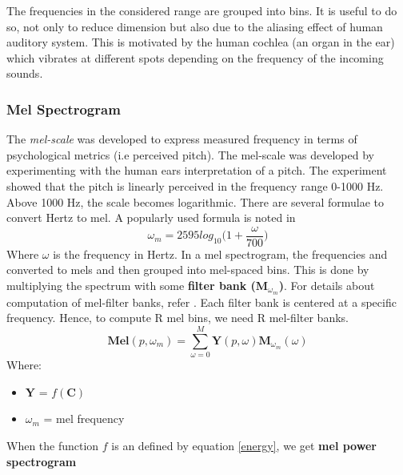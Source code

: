 \noindent The frequencies in the considered range are  grouped into bins. It is useful to do so, not only to reduce dimension but also due to the aliasing effect of human auditory system. This is motivated by the human cochlea (an organ in the ear) which vibrates at different spots depending on the frequency of the incoming sounds.
  
\subsubsection{Mel Spectrogram}
\label{mel}

The \textit{mel-scale} was developed to express measured frequency in terms of psychological metrics (i.e perceived pitch). The mel-scale was developed
by experimenting with the human ears interpretation of a pitch. The experiment showed that the pitch is linearly perceived in the frequency range 0-1000 Hz. Above
1000 Hz, the scale becomes logarithmic. There are several formulae to convert Hertz to mel. A popularly used formula is noted in \cite{speech}
\begin{equation}
\omega_{m} = 2595log_{10}\bigg(1+\frac{ \omega }{700}\bigg)
\end{equation}
Where $\omega$ is the frequency in Hertz. In a mel spectrogram, the frequencies and converted to mels and then grouped into mel-spaced bins. This is done by multiplying the spectrum with some \textbf{filter bank ($\textbf{M}_{\omega_{m}}$)}. For details about computation of mel-filter banks, refer \cite{mel}. Each filter bank is centered at a specific frequency. Hence, to compute R mel bins, we need R mel-filter banks. 
\begin{equation}
\label{mel_conv}
\textbf{Mel}(p,\omega_{m}) = \displaystyle\sum_{ \omega = 0}^{M}\textbf{Y}(p, \omega)\textbf{M}_{\omega_{m}}(\omega)
\end{equation}
Where:
\begin{itemize}[label=]
    \setlength\itemsep{0em}
    \item $\textbf{Y}$ = $f(\textbf{C})$
    \item $\omega_{m}$ = mel frequency
\end{itemize}    
When the function $f$ is an defined by equation \ref{energy}, we get \textbf{mel power spectrogram}
\bigskip

